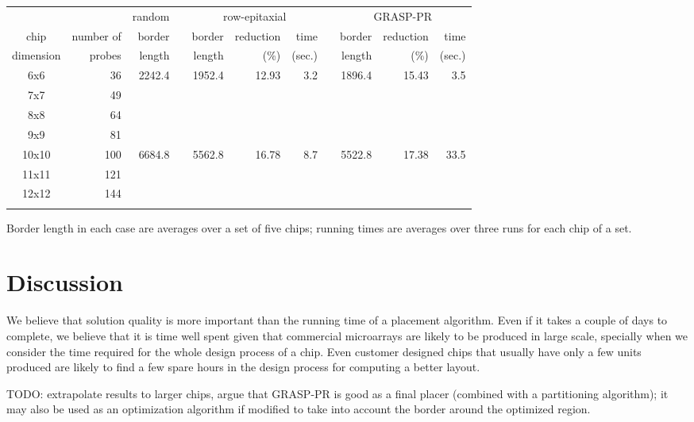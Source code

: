 \documentclass{bioinfo}
\begin{document}
\begin{table*}[t]
{\begin{tabular}{crrcrrrcrrr} \toprule
          &            & random & & \multicolumn{3}{c}{row-epitaxial}  & & \multicolumn{3}{c}{GRASP-PR}  \\ \cline{3-3} \cline{5-7} \cline{9-11}
chip      & number of  & border & & border & reduction & time          & & border & reduction & time   \\
dimension & probes     & length & & length & (\%)      & (sec.)        & & length & (\%)      & (sec.) \\ \midrule
6x6 & 36 & 2242.4 & & 1952.4 & 12.93 & 3.2 & & 1896.4 & 15.43 & 3.5 \\
7x7 & 49 & & & & & & & & & \\
8x8 & 64 & & & & & & & & & \\
9x9 & 81 & & & & & & & & & \\
10x10 & 100 & 6684.8 & & 5562.8 & 16.78 & 8.7 & & 5522.8 & 17.38 & 33.5 \\
11x11 & 121 & & & & & & & & & \\
12x12 & 144 & & & & & & & & & \\ \botrule
\end{tabular}}{Border length in each case are averages over a set of five chips; running times are averages over three runs for each chip of a set.}
\end{table*}

\section{Discussion}

We believe that solution quality is more important than the running time of a placement algorithm. Even if it takes a couple of days to complete, we believe that it is time well spent given that commercial microarrays are likely to be produced in large scale, specially when we consider the time required for the whole design process of a chip. Even customer designed chips that usually have only a few units produced are likely to find a few spare hours in the design process for computing a better layout.

TODO: extrapolate results to larger chips, argue that GRASP-PR is good as a final placer (combined with a partitioning algorithm); it may also be used as an optimization algorithm if modified to take into account the border around the optimized region.
\end{document}
